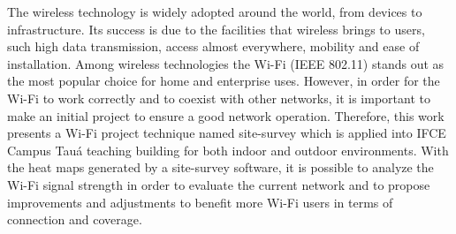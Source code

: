 The wireless technology is widely adopted around the world, from devices to infrastructure. Its success is due to the facilities that wireless brings to users, such high data transmission, access almost everywhere, mobility and ease of installation. Among wireless technologies the Wi-Fi (IEEE 802.11) stands out as the most popular choice for home and enterprise uses. However, in order for the Wi-Fi to work correctly and to coexist with other networks, it is important to make an initial project to ensure a good network operation. Therefore, this work presents a Wi-Fi project technique named site-survey which is applied into IFCE Campus Tauá teaching building for both indoor and outdoor environments. With the heat maps generated by a site-survey software, it is possible to analyze the Wi-Fi signal strength in order to evaluate the current network and to propose improvements and adjustments to benefit more Wi-Fi users in terms of connection and coverage.

